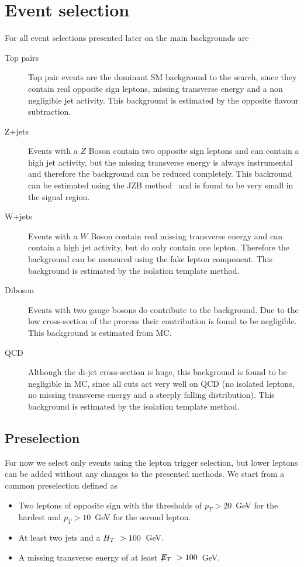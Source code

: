 \section{Event selection}\label{sec:eventselection}

For all event selections presented later on
the main backgrounds are
\begin{description}
\item[Top pairs] Top pair events are the dominant SM background to the search, 
    since they contain real opposite sign leptons, missing transverse energy and
    a non negligible jet activity. This background is estimated by the opposite
    flavour subtraction.
\item[Z+jets] Events with a $Z$ Boson contain two opposite sign leptons and 
    can contain a high jet activity, but the missing transverse energy is always
   instrumental and therefore the background can be reduced completely.
   This backround can be estimated using the JZB method~\cite{kostas}
   and is found to be very small in the signal region.
\item[W+jets] Events with a $W$ Boson contain real missing transverse energy and
    can contain a high jet activity, but do only contain one lepton.
    Therefore the background can be measured using the fake lepton component.
    This background is estimated by the isolation template method.
\item[Diboson] Events with two gauge bosons do contribute to the background.
    Due to the low cross-section of the process their contribution is found
    to be negligible. This background is estimated from MC.
\item[QCD] Although the di-jet cross-section is huge, this background is found to 
    be negligible in MC, since all cuts act very well on QCD (no isolated leptons,
    no missing transverse energy and  a steeply falling \HT distribution). 
    This background is estimated by the isolation template method.
\end{description}

\subsection{Preselection}

For now we select only events using the lepton trigger selection,
but lower \pT leptons can be added without any changes to the 
presented methods.
We start from a common preselection defined as
\begin{itemize}
\item Two leptons of opposite sign with the thresholds
of $p_T>20$~GeV for the hardest and $p_T>10$~GeV for 
the second lepton.
\item At least two jets and a $H_T~>100$~GeV.
\item A missing transverse energy of at least $\displaystyle{\not} E_T~>100$~GeV.
\end{itemize}

